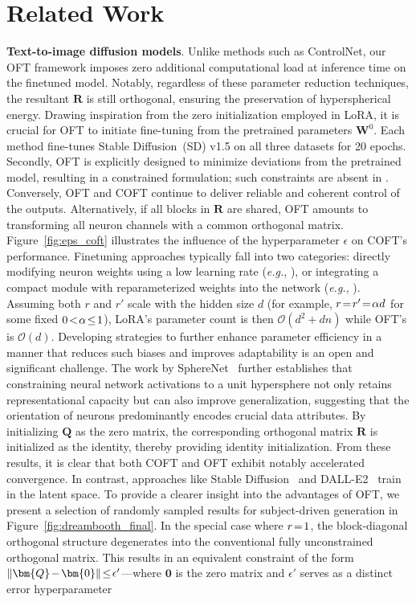 \section{Related Work}

\textbf{Text-to-image diffusion models}. Unlike methods such as ControlNet, our OFT framework imposes zero additional computational load at inference time on the finetuned model. Notably, regardless of these parameter reduction techniques, the resultant $\bm{R}$ is still orthogonal, ensuring the preservation of hyperspherical energy. Drawing inspiration from the zero initialization employed in LoRA, it is crucial for OFT to initiate fine-tuning from the pretrained parameters $\bm{W}^0$. Each method fine-tunes Stable Diffusion~(SD) v1.5 on all three datasets for 20 epochs. Secondly, OFT is explicitly designed to minimize deviations from the pretrained model, resulting in a constrained formulation; such constraints are absent in \cite{liu2021orthogonal}. Conversely, OFT and COFT continue to deliver reliable and coherent control of the outputs. Alternatively, if all blocks in $\bm{R}$ are shared, OFT amounts to transforming all neuron channels with a common orthogonal matrix. Figure~\ref{fig:eps_coft} illustrates the influence of the hyperparameter $\epsilon$ on COFT's performance. Finetuning approaches typically fall into two categories: directly modifying neuron weights using a low learning rate (\emph{e.g.}, \cite{ruiz2023dreambooth}), or integrating a compact module with reparameterized weights into the network (\emph{e.g.}, \cite{hulora2022,zhang2023adding}). Assuming both $r$ and $r'$ scale with the hidden size $d$ (for example, $\thickmuskip=2mu \medmuskip=2mu r=r'=\alpha d$ for some fixed $\thickmuskip=2mu \medmuskip=2mu 0<\alpha\leq 1$), LoRA's parameter count is then $\mathcal{O}(d^2+dn)$ while OFT's is $\mathcal{O}(d)$. Developing strategies to further enhance parameter efficiency in a manner that reduces such biases and improves adaptability is an open and significant challenge. The work by SphereNet~\cite{liu2017deep} further establishes that constraining neural network activations to a unit hypersphere not only retains representational capacity but can also improve generalization, suggesting that the orientation of neurons predominantly encodes crucial data attributes. By initializing $\bm{Q}$ as the zero matrix, the corresponding orthogonal matrix $\bm{R}$ is initialized as the identity, thereby providing identity initialization. From these results, it is clear that both COFT and OFT exhibit notably accelerated convergence. In contrast, approaches like Stable Diffusion~\cite{rombach2022high} and DALL-E2~\cite{ramesh2022hierarchical} train in the latent space. To provide a clearer insight into the advantages of OFT, we present a selection of randomly sampled results for subject-driven generation in Figure~\ref{fig:dreambooth_final}. In the special case where $\thickmuskip=2mu \medmuskip=2mu r=1$, the block-diagonal orthogonal structure degenerates into the conventional fully unconstrained orthogonal matrix. This results in an equivalent constraint of the form $\thickmuskip=2mu \medmuskip=2mu \|\bm{Q}-\bm{0}\|\leq\epsilon'$—where $\bm{0}$ is the zero matrix and $\epsilon'$ serves as a distinct error hyperparameter 